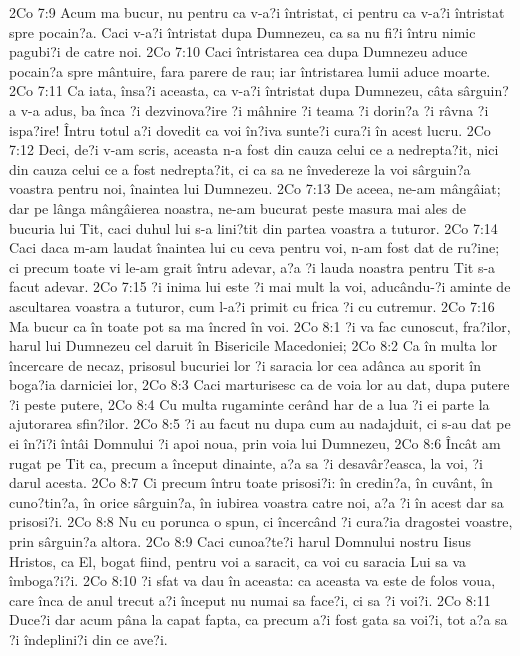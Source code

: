 2Co 7:9  Acum ma bucur, nu pentru ca v-a?i întristat, ci pentru ca v-a?i întristat spre pocain?a. Caci v-a?i întristat dupa Dumnezeu, ca sa nu fi?i întru nimic pagubi?i de catre noi.
2Co 7:10  Caci întristarea cea dupa Dumnezeu aduce pocain?a spre mântuire, fara parere de rau; iar întristarea lumii aduce moarte.
2Co 7:11  Ca iata, însa?i aceasta, ca v-a?i întristat dupa Dumnezeu, câta sârguin?a v-a adus, ba înca ?i dezvinova?ire ?i mâhnire ?i teama ?i dorin?a ?i râvna ?i ispa?ire! Întru totul a?i dovedit ca voi în?iva sunte?i cura?i în acest lucru.
2Co 7:12  Deci, de?i v-am scris, aceasta n-a fost din cauza celui ce a nedrepta?it, nici din cauza celui ce a fost nedrepta?it, ci ca sa ne învedereze la voi sârguin?a voastra pentru noi, înaintea lui Dumnezeu.
2Co 7:13  De aceea, ne-am mângâiat; dar pe lânga mângâierea noastra, ne-am bucurat peste masura mai ales de bucuria lui Tit, caci duhul lui s-a lini?tit din partea voastra a tuturor.
2Co 7:14  Caci daca m-am laudat înaintea lui cu ceva pentru voi, n-am fost dat de ru?ine; ci precum toate vi le-am grait întru adevar, a?a ?i lauda noastra pentru Tit s-a facut adevar.
2Co 7:15  ?i inima lui este ?i mai mult la voi, aducându-?i aminte de ascultarea voastra a tuturor, cum l-a?i primit cu frica ?i cu cutremur.
2Co 7:16  Ma bucur ca în toate pot sa ma încred în voi.
2Co 8:1  ?i va fac cunoscut, fra?ilor, harul lui Dumnezeu cel daruit în Bisericile Macedoniei;
2Co 8:2  Ca în multa lor încercare de necaz, prisosul bucuriei lor ?i saracia lor cea adânca au sporit în boga?ia darniciei lor,
2Co 8:3  Caci marturisesc ca de voia lor au dat, dupa putere ?i peste putere,
2Co 8:4  Cu multa rugaminte cerând har de a lua ?i ei parte la ajutorarea sfin?ilor.
2Co 8:5  ?i au facut nu dupa cum au nadajduit, ci s-au dat pe ei în?i?i întâi Domnului ?i apoi noua, prin voia lui Dumnezeu,
2Co 8:6  Încât am rugat pe Tit ca, precum a început dinainte, a?a sa ?i desavâr?easca, la voi, ?i darul acesta.
2Co 8:7  Ci precum întru toate prisosi?i: în credin?a, în cuvânt, în cuno?tin?a, în orice sârguin?a, în iubirea voastra catre noi, a?a ?i în acest dar sa prisosi?i.
2Co 8:8  Nu cu porunca o spun, ci încercând ?i cura?ia dragostei voastre, prin sârguin?a altora.
2Co 8:9  Caci cunoa?te?i harul Domnului nostru Iisus Hristos, ca El, bogat fiind, pentru voi a saracit, ca voi cu saracia Lui sa va îmboga?i?i.
2Co 8:10  ?i sfat va dau în aceasta: ca aceasta va este de folos voua, care înca de anul trecut a?i început nu numai sa face?i, ci sa ?i voi?i.
2Co 8:11  Duce?i dar acum pâna la capat fapta, ca precum a?i fost gata sa voi?i, tot a?a sa ?i îndeplini?i din ce ave?i.
